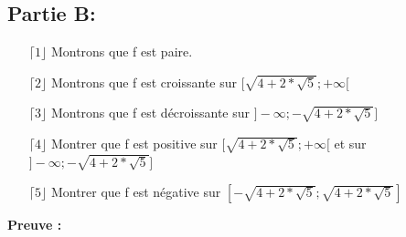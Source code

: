 \documentclass[a4paper, 12pt]{article}
\begin{document}
\newpage
\subsection{Partie B:}

\begin{itemize}
	\item[\(\lceil 1 \rfloor\)] Montrons que f est paire.
	\item[\(\lceil 2 \rfloor\)] Montrons que f est croissante sur \( [ \sqrt{4 + 2 * \sqrt{5}} ; +\infty [ \)
	\item[\(\lceil 3 \rfloor\)] Montrons que f est décroissante sur \( ] -\infty ; -\sqrt{4 + 2 * \sqrt{5}} ] \)
	\item[\(\lceil 4 \rfloor\)] Montrer que f est positive sur \( [ \sqrt{4 + 2 * \sqrt{5}} ; +\infty [ \) et sur \( ] -\infty ; -\sqrt{4 + 2 * \sqrt{5}} ] \)
	\item[\(\lceil 5 \rfloor\)] Montrer que f est négative sur \( [ -\sqrt{4 + 2 * \sqrt{5}} ; \sqrt{4 + 2 * \sqrt{5}} ] \)
\end{itemize}

\textbf{Preuve :}
\end{document}
